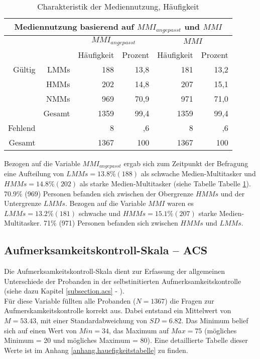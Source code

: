 \begin{table}[H] 
    \centering
    \caption{Charakteristik der Mediennutzung, Häufigkeit}
    \begin{tabular}[t]{|r r|r|r|r|r|} 
        \hline
        \multicolumn{6}{|c|}{\textbf{Mediennutzung basierend auf $MMI_{angepasst}$ und $MMI$}}\\ 
        \hline       
        \multicolumn{2}{|c}{} & \multicolumn{2}{c|}{$MMI_{angepasst}$} & \multicolumn{2}{c|}{$MMI$}\\
        \multicolumn{2}{|c}{} & \multicolumn{1}{c|}{Häufigkeit} & \multicolumn{1}{c|}{Prozent}&\multicolumn{1}{c|}{Häufigkeit} & \multicolumn{1}{c|}{Prozent}\\
        \hline
        Gültig & LMMs & 188 & 13,8 & 181 & 13,2\\
        & HMMs & 202 & 14,8 & 207 & 15,1\\
        & NMMs & 969 & 70,9 & 971 & 71,0\\
        &Gesamt & 1359 & 99,4 & 1359 & 99,4\\
        Fehlend & & 8 & ,6 & 8 & ,6\\
        Gesamt & & 1367 & 100 & 1367 & 100\\
        \hline
    \end{tabular}
    \label{table.deskrptMeediennutzung}
\end{table}

Bezogen auf die Variable $MMI_{angepasst}$ ergab sich zum Zeitpunkt der Befragung eine Aufteilung von $LMMs = 13.8\% (188)$ als schwache Medien-Multitasker und $HMMs = 14.8\% (202)$ als starke Medien-Multitasker (siehe Tabelle Tabelle \ref{table.deskrptMeediennutzung}). 70.9\% (969) Personen befanden sich zwischen der Obergrenze $HMMs$ und der Untergrenze $LMMs$.
Bezogen auf die Variable $MMI$ waren es $LMMs = 13.2\% (181)$ schwache und $HMMs = 15.1\% (207)$ starke Medien-Multitasker. 71\% (971) Personen befanden sich zwischen $HMMs$ und $LMMs$. 

\subsection{Aufmerksamkeitskontroll-Skala -- ACS}
Die Aufmerksamkeitskontroll-Skala dient zur Erfassung der allgemeinen Unterschiede der Probanden in der selbstinitierten Aufmerksamkeitskontrolle (siehe dazu Kapitel \ref{subsection.acs} - ). \\ Für diese Variable füllten alle Probanden ($N=1367$) die Fragen zur Aufmerskamkeitskontrolle korrekt aus. Dabei entstand ein Mittelwert von $M = 53.43$, mit einer Standardabweichung von $SD = 6.82$. Das Minimum belief sich auf einen Wert von $Min = 34$, das Maximum auf $Max = 75$ (mögliches Minimum = 20 und mögliches Maximum = 80). Eine detaillierte Tabelle dieser Werte ist im Anhang \ref{anhang.hauefigkeitstabelle} zu finden.
